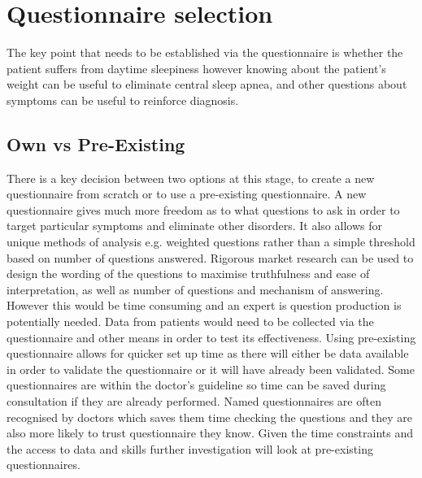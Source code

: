 \section{Questionnaire selection}
The key point that needs to be established via the questionnaire is whether the patient suffers from daytime sleepiness however knowing about the patient’s weight can be useful to eliminate central sleep apnea, and other questions about symptoms can be useful to reinforce diagnosis. 

\subsection{Own vs Pre-Existing}
There is a key decision between two options at this stage, to create a new questionnaire from scratch or to use a pre-existing questionnaire. A new questionnaire gives much more freedom as to what questions to ask in order to target particular symptoms and eliminate other disorders. It also allows for unique methods of analysis e.g. weighted questions rather than a simple threshold based on number of questions answered. Rigorous market research can be used to design the wording of the questions to maximise truthfulness and ease of interpretation, as well as number of questions and mechanism of answering. However this would be time consuming and an expert is question production is potentially needed. Data from patients would need to be collected via the questionnaire and other means in order to test its effectiveness. 
Using pre-existing questionnaire allows for quicker set up time as there will either be data available in order to validate the questionnaire or it will have already been validated. Some questionnaires are within the doctor’s guideline so time can be saved during consultation if they are already performed. Named questionnaires are often recognised by doctors which saves them time checking the questions and they are also more likely to trust questionnaire they know. 
Given the time constraints and the access to data and skills further investigation will look at pre-existing questionnaires. 


